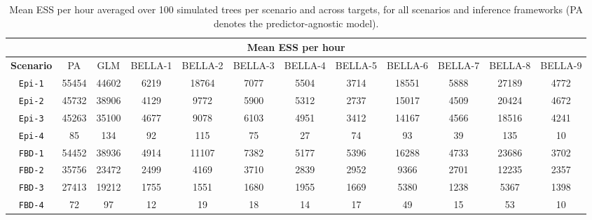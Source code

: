 \begin{landscape}
    \begin{table}[h!]
        \centering
        \begin{tabular}{cccccccccccc}
            \toprule

            \multicolumn{12}{c}{\textbf{Mean ESS per hour}}                                                                                                                                                                                                                                                                                                      \\
            \midrule

            \textbf{Scenario} & PA                     & GLM                     & BELLA-1                     & BELLA-2                     & BELLA-3                     & BELLA-4                     & BELLA-5                     & BELLA-6                     & BELLA-7                     & BELLA-8                     & BELLA-9                     \\
            \midrule

            \texttt{Epi-1}    & 55454   & 44602   & 6219   & 18764   & 7077   & 5504   & 3714   & 18551   & 5888   & 27189   & 4772   \\[6pt]

            \texttt{Epi-2}    & 45732   & 38906   & 4129   & 9772   & 5900   & 5312   & 2737   & 15017   & 4509   & 20424   & 4672   \\[6pt]

            \texttt{Epi-3}    & 45263   & 35100   & 4677   & 9078   & 6103   & 4951   & 3412   & 14167   & 4566   & 18516   & 4241   \\[6pt]

            \texttt{Epi-4}    & 85   & 134   & 92   & 115   & 75   & 27   & 74   & 93   & 39   & 135   & 10   \\[6pt]

            \texttt{FBD-1}    & 54452 & 38936 & 4914 & 11107 & 7382 & 5177 & 5396 & 16288 & 4733 & 23686 & 3702 \\[6pt]

            \texttt{FBD-2}    & 35756 & 23472 & 2499 & 4169 & 3710 & 2839 & 2952 & 9366 & 2701 & 12235 & 2357 \\[6pt]

            \texttt{FBD-3}    & 27413 & 19212 & 1755 & 1551 & 1680 & 1955 & 1669 & 5380 & 1238 & 5367 & 1398 \\[6pt]

            \texttt{FBD-4}    & 72     & 97     & 12     & 19     & 18     & 14     & 17     & 49     & 15     & 53     & 10     \\[6pt]

            \bottomrule
        \end{tabular}
        \caption{Mean ESS per hour averaged over 100 simulated trees per scenario and across targets, for all scenarios and inference frameworks (PA denotes the predictor-agnostic model). }%
        \label{tab:mean_ess_per_hour}
    \end{table}
\end{landscape}
